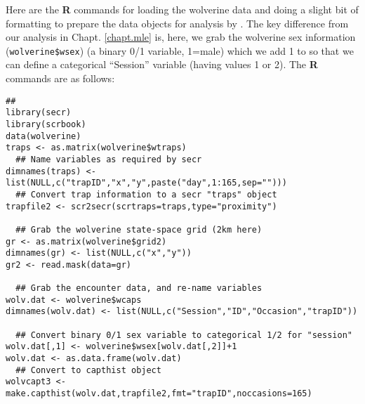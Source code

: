 Here are the {\bf R} commands for loading the wolverine data and doing
a slight bit of formatting to prepare the data objects for analysis by
\mbox{\secr}. The key difference from our analysis in
Chapt. \ref{chapt.mle} is, here, we grab the wolverine sex information
(\mbox{\tt wolverine\$wsex}) (a binary 0/1 variable, 1=male) which we add
1 to so that we can define a categorical  ``Session'' variable (having
values 1 or 2).
The {\bf R} commands are as follows: 
{\small
\begin{verbatim}
##
library(secr)
library(scrbook)
data(wolverine)
traps <- as.matrix(wolverine$wtraps)
  ## Name variables as required by secr
dimnames(traps) <- list(NULL,c("trapID","x","y",paste("day",1:165,sep="")))
  ## Convert trap information to a secr "traps" object
trapfile2 <- scr2secr(scrtraps=traps,type="proximity")

  ## Grab the wolverine state-space grid (2km here)
gr <- as.matrix(wolverine$grid2)
dimnames(gr) <- list(NULL,c("x","y"))
gr2 <- read.mask(data=gr)

  ## Grab the encounter data, and re-name variables
wolv.dat <- wolverine$wcaps
dimnames(wolv.dat) <- list(NULL,c("Session","ID","Occasion","trapID"))

  ## Convert binary 0/1 sex variable to categorical 1/2 for "session"
wolv.dat[,1] <- wolverine$wsex[wolv.dat[,2]]+1
wolv.dat <- as.data.frame(wolv.dat)
  ## Convert to capthist object
wolvcapt3 <- make.capthist(wolv.dat,trapfile2,fmt="trapID",noccasions=165)
\end{verbatim}
}

